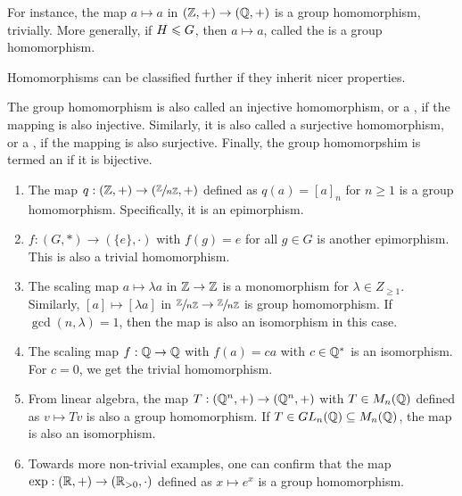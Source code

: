 \begin{example}
    For instance, the map $a \mapsto a$ in $(\mathbb{Z},+) \to (\mathbb{Q},+)$ is a group homomorphism, trivially. More generally, if $H \leqslant G$, then $a \mapsto a$, called the  is a group homomorphism.
\end{example}

Homomorphisms can be classified further if they inherit nicer properties.

\begin{definition}
    The group homomorphism is also called an injective homomorphism, or a , if the mapping is also injective. Similarly, it is also called a surjective homomorphism, or a , if the mapping is also surjective. Finally, the group homomorpshim is termed an  if it is bijective.
\end{definition}

\begin{example}
    \begin{enumerate}
        \item The map $q:(\mathbb{Z},+) \to (\sfrac{\mathbb{Z}}{n\mathbb{Z}},+)$ defined as $q(a) = [a]_{n}$ for $n \geq 1$ is a group homomorphism. Specifically, it is an epimorphism.
        
        \item $f:(G,\ast) \to (\{e\},\cdot)$ with $f(g) = e$ for all $g \in G$ is another epimorphism. This is also a trivial homomorphism.
        
        \item The scaling map $a \mapsto \lambda a$ in $\mathbb{Z} \to \mathbb{Z}$ is a monomorphism for $\lambda \in Z_{\geq 1}$. Similarly, $[a] \mapsto [\lambda a]$ in $\sfrac{\mathbb{Z}}{n\mathbb{Z}} \to \sfrac{\mathbb{Z}}{n\mathbb{Z}}$ is group homomorphism. If $\gcd(n,\lambda) = 1$, then the map is also an isomorphism in this case.
        
        \item The scaling map $f:\mathbb{Q} \to \mathbb{Q}$ with $f(a) = ca$ with $c \in \mathbb{Q}^{\ast}$ is an isomorphism. For $c = 0$, we get the trivial homomorphism.
        
        \item From linear algebra, the map $T:(\mathbb{Q}^{n},+) \to (\mathbb{Q}^{n},+)$ with $T \in M_{n}(\mathbb{Q})$ defined as $v \mapsto Tv$ is also a group homomorphism. If $T \in GL_{n}(\mathbb{Q}) \subseteq M_{n}(\mathbb{Q})$, the map is also an isomorphism.
        
        \item Towards more non-trivial examples, one can confirm that the map $\exp:(\mathbb{R},+) \to (\mathbb{R}_{> 0},\cdot)$ defined as $x \mapsto e^{x}$ is a group homomorphism.
    \end{enumerate}
\end{example}


